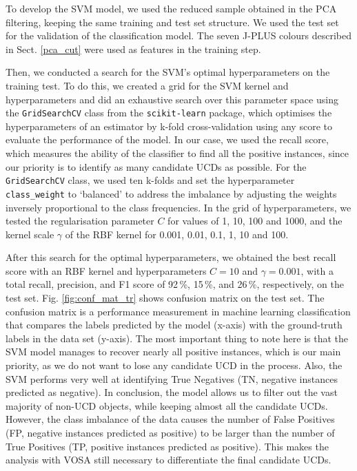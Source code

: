 To develop the SVM model, we used the reduced sample obtained in the PCA filtering, keeping the same training and test set structure. We used the test set for the validation of the classification model. The seven J-PLUS colours described in Sect. \ref{pca_cut} were used as features in the training step.

Then, we conducted a search for the SVM's optimal hyperparameters on the training test. To do this, we created a grid for the SVM kernel and hyperparameters and did an exhaustive search over this parameter space using the \texttt{GridSearchCV} class from the \texttt{scikit-learn} package, which optimises the hyperparameters of an estimator by k-fold cross-validation using any score to evaluate the performance of the model. In our case, we used the recall score, which measures the ability of the classifier to find all the positive instances, since our priority is to identify as many candidate UCDs as possible. For the \texttt{GridSearchCV} class, we used ten k-folds and set the hyperparameter \texttt{class\_weight} to `balanced' to address the imbalance by adjusting the weights inversely proportional to the class frequencies. In the grid of hyperparameters, we tested the regularisation parameter $C$ for values of 1, 10, 100 and 1000, and the kernel scale $\gamma$ of the RBF kernel for 0.001, 0.01, 0.1, 1, 10 and 100.

After this search for the optimal hyperparameters, we obtained the best recall score with an RBF kernel and hyperparameters $C=10$ and $\gamma=0.001$, with a total recall, precision, and F1 score of 92\,\%, 15\,\%, and 26\,\%, respectively, on the test set.  Fig. \ref{fig:conf_mat_tr} shows confusion matrix on the test set. The confusion matrix is a performance measurement in machine learning classification that compares the labels predicted by the model (x-axis) with the ground-truth labels in the data set (y-axis). The most important thing to note here is that the SVM model manages to recover nearly all positive instances, which is our main priority, as we do not want to lose any candidate UCD in the process. Also, the SVM performs very well at identifying True Negatives (TN, negative instances predicted as negative). In conclusion, the model allows us to filter out the vast majority of non-UCD objects, while keeping almost all the candidate UCDs. However, the class imbalance of the data causes the number of False Positives (FP, negative instances predicted as positive) to be larger than the number of True Positives (TP, positive instances predicted as positive). This makes the analysis with VOSA still necessary to differentiate the final candidate UCDs.

